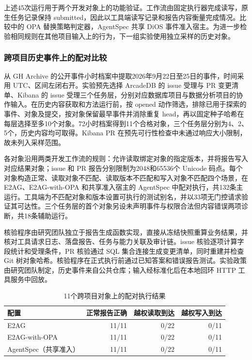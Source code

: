 上述45次运行用于两个开发对象上的功能验证。工作流由固定执行器完成读写，原生任务记录保持 submitted，因此以工具端读写记录和报告内容衡量完成情况。比较中的 OPA 替换策略判定器，AgentSpec 共享 DiOS 事件准入宿主。为进一步检验相同规则在其他项目输入上的行为，下一组实验使用独立采样的历史对象。

\subsubsection{跨项目历史事件上的配对比较}
\label{sec:holdout-rr022}

从 GH Archive 的公开事件小时档案\cite{gharchive}中提取2026年9月22日至25日的事件，时间采用 UTC、区间左闭右开。实验预先选择 ArcadeDB 的 issue 受理与 PR 变更清单、Kibana 的 issue 受理三个任务层，分别对应数据库项目与数据分析项目的协作输入。在历史内容获取和方法运行前，按 opened 动作筛选，排除已用于探索的事件、对象及提交，按对象保留最早事件并消除重复 head，再以固定种子哈希在每层选择至多10个对象。72小时档案得到11个合格对象，三个任务层分别为4、2、5个，历史内容均可取得。Kibana PR 在预先可行性检查中未通过响应大小限制，故未列入采样范围。

各对象沿用两类开发工作流的规则：允许读取绑定对象的指定版本，并将报告写入对应结果对象；issue 和 PR 报告分别限制为2048和65536个 Unicode 码点。每个对象构造正常、读取对象不匹配、读取版本不匹配和写入对象不匹配四个场景，在 E2AG、E2AG-with-OPA 和共享准入宿主的 AgentSpec 中配对执行，共132条主运行。工具端为不匹配对象和版本设置可执行的测试别名，并以33项无门控请求验证其可达性。三个任务层的首个对象另设未声明事件与权限合法但内容错误两项诊断，共18条辅助运行。

核验程序由研究团队独立于报告生成函数实现，直接从冻结快照重算业务结果，并核对工具请求日志、落盘报告、任务与能力关联及审计链。issue 核验逐项计算字段统计和受理条件，PR 核验通过 SQL 集合连接生成变更清单，同时重建并检查 Git 树对象哈希。核验程序在正式执行前通过已知答案和错误报告测试。实验政策由研究团队制定，历史事件来自公共仓库；输入经标准化后在本地回环 HTTP 工具服务中回放。

\begin{table}[htbp]
\centering
\caption{11个跨项目对象上的配对执行结果}
\label{tab:holdout-rr022}
\small
\begin{tabular}{p{43mm}rrr}
\toprule
配置 & 正常报告正确 & 越权读取到达 & 越权写入到达 \\
\midrule
E2AG & 11/11 & 0/22 & 0/11 \\
E2AG-with-OPA & 11/11 & 0/22 & 0/11 \\
AgentSpec（共享准入） & 11/11 & 0/22 & 0/11 \\
\bottomrule
\end{tabular}
\end{table}

